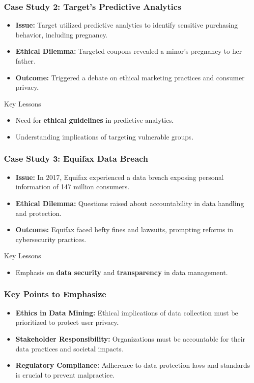 \documentclass[aspectratio=169]{beamer}
\begin{document}
\begin{frame}[fragile]
    \frametitle{Case Study 2: Target's Predictive Analytics}
    \begin{itemize}
        \item \textbf{Issue:} Target utilized predictive analytics to identify sensitive purchasing behavior, including pregnancy.
        \item \textbf{Ethical Dilemma:} Targeted coupons revealed a minor's pregnancy to her father.
        \item \textbf{Outcome:} Triggered a debate on ethical marketing practices and consumer privacy.
    \end{itemize}
    
    \begin{block}{Key Lessons}
        \begin{itemize}
            \item Need for \textbf{ethical guidelines} in predictive analytics.
            \item Understanding implications of targeting vulnerable groups.
        \end{itemize}
    \end{block}
\end{frame}

\begin{frame}[fragile]
    \frametitle{Case Study 3: Equifax Data Breach}
    \begin{itemize}
        \item \textbf{Issue:} In 2017, Equifax experienced a data breach exposing personal information of 147 million consumers.
        \item \textbf{Ethical Dilemma:} Questions raised about accountability in data handling and protection.
        \item \textbf{Outcome:} Equifax faced hefty fines and lawsuits, prompting reforms in cybersecurity practices.
    \end{itemize}
    
    \begin{block}{Key Lessons}
        \begin{itemize}
            \item Emphasis on \textbf{data security} and \textbf{transparency} in data management.
        \end{itemize}
    \end{block}
\end{frame}

\begin{frame}[fragile]
    \frametitle{Key Points to Emphasize}
    \begin{itemize}
        \item \textbf{Ethics in Data Mining:} Ethical implications of data collection must be prioritized to protect user privacy.
        \item \textbf{Stakeholder Responsibility:} Organizations must be accountable for their data practices and societal impacts.
        \item \textbf{Regulatory Compliance:} Adherence to data protection laws and standards is crucial to prevent malpractice.
    \end{itemize}
\end{frame}
\end{document}
